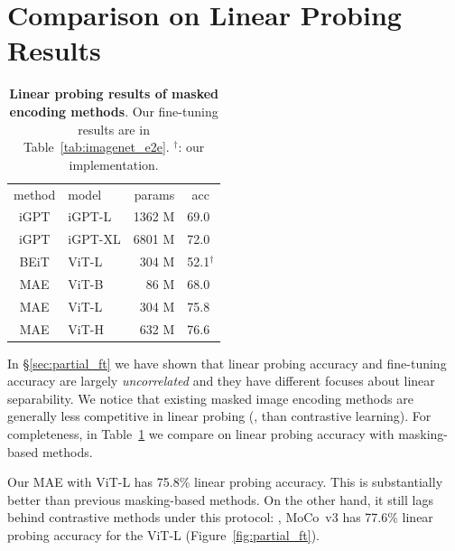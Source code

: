 \documentclass[10pt,twocolumn,letterpaper]{article}
\newcommand{\tablestyle}[2]{\setlength{\tabcolsep}{#1}\renewcommand{\arraystretch}{#2}\centering\footnotesize}
\begin{document}
\section{Comparison on Linear Probing Results}

\begin{table}[t]
\tablestyle{8pt}{1.05}
\begin{tabular}{clrl}
method & model & params & \multicolumn{1}{c}{acc} \\
\shline
iGPT \cite{Chen2020c} & iGPT-L & 1362 M & 69.0 \\
iGPT \cite{Chen2020c} & iGPT-XL & 6801 M & 72.0 \\
BEiT \cite{Bao2021} & ViT-L & 304 M & 52.1${^\dagger}$ \\
\hline
MAE & ViT-B & 86 M & 68.0 \\
MAE & ViT-L & 304 M & 75.8 \\
MAE & ViT-H & 632 M & 76.6
\end{tabular}
\vspace{-1em}
\caption{\textbf{Linear probing results of masked encoding methods}. Our fine-tuning results are in Table~\ref{tab:imagenet_e2e}. ${^\dagger}$: our implementation.}
\label{tab:imagenet_linear}
\end{table}

In \S\ref{sec:partial_ft} we have shown that linear probing accuracy and fine-tuning accuracy are largely \mbox{\textit{uncorrelated}} and they have different focuses about linear separability. We notice that existing masked image encoding methods are generally less competitive in linear probing (\eg, than contrastive learning). For completeness, in Table~\ref{tab:imagenet_linear} we compare on linear probing accuracy with masking-based methods.

Our MAE with ViT-L has 75.8\% linear probing accuracy. This is substantially better than previous masking-based methods. On the other hand, it still lags behind contrastive methods under this protocol: \eg, MoCo~v3 \cite{Chen2021a} has 77.6\% linear probing accuracy for the ViT-L (Figure~\ref{fig:partial_ft}).
\end{document}
